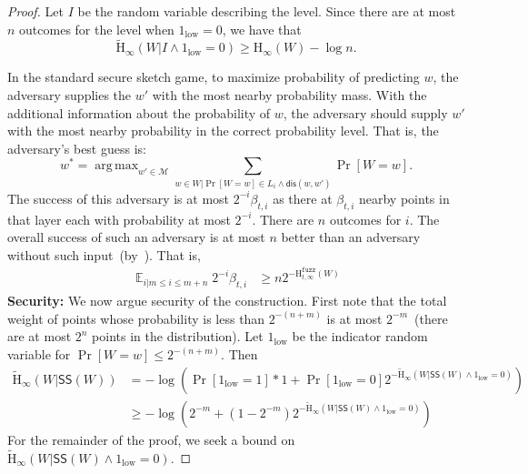 \documentclass[11pt]{article}
\DeclareMathOperator*{\expe}{\mathbb{E}}
\DeclareMathOperator*{\argmax}{arg\,max}
\newcommand{\class}[1]{{\ensuremath{\mathsf{#1}}}}
\newcommand{\sketch}{\ensuremath{\class{SS}}\xspace}
\newcommand{\dis}{\ensuremath{\mathsf{dis}}}
\newcommand{\Hoo}{\mathrm{H}_\infty}
\newcommand{\Hav}{\tilde{\mathrm{H}}_\infty}
\newcommand{\Hfuzz}{\mathrm{H}^{\mathtt{fuzz}}_{t,\infty}}
\begin{document}
\begin{proof}
Let $I$ be the random variable describing the level.  Since there are at most $n$ outcomes for the level when $1_{\text{low}} =0$, we have that \[\Hav( W | I \wedge 1_{\text{low}}=0) \ge \Hoo(W) -\log n.\]

In the standard secure sketch game, to maximize probability of predicting $w$, the adversary supplies the $w'$ with the most nearby probability mass.  With the additional information about the probability of $w$, the adversary should supply $w'$ with the most nearby probability in the correct probability level.  That is, the adversary's best guess is:
\[
w^*= \argmax_{w' \in \mathcal{M}}\sum_{w\in W | \Pr[W=w]\in L_i\wedge \dis(w, w')}\Pr[W=w].
\] 
The success of this adversary is at most $2^{-i}\beta_{t,i}$ as there at $\beta_{t,i}$ nearby points in that layer each with probability at most $2^{-i}$.  There are $n$ outcomes for $i$. The overall success of such an adversary is at most $n$ better than an adversary without such input~(by~\cite[Lemma 2.2]{DBLP:journals/siamcomp/DodisORS08}).  That is, 
\begin{align}
\expe_{i | m\le i \le m+n}2^{-i}\beta_{t,i}%
&\ge n 2^{-\Hfuzz(W)}\label{eq:link fuzz 3}
\end{align}
\textbf{Security:}
We now argue security of the construction.  First note that the total weight of points whose probability is less than $2^{-(n+m)}$ is at most $2^{-m}$~(there are at most $2^n$ points in the distribution).  Let $1_{\text{low}}$ be the indicator random variable for $\Pr[W=w]\le 2^{-(n+m)}$.  Then 
\begin{align}
\Hav(W | \sketch(W)) &= -\log \left(\Pr[1_{\text{low}}=1] * 1 + \Pr[1_{\text{low}} =0]   2^{-\Hav(W | \sketch(W) \wedge 1_{\text{low}} = 0)}\right)\nonumber\\
&\ge -\log\left( 2^{-m} + (1-2^{-m})2^{-\Hav(W | \sketch(W) \wedge 1_{\text{low}} = 0)}\label{eq:min-entropy}\right)
\end{align}
For the remainder of the proof, we seek a bound on $\Hav(W | \sketch(W) \wedge 1_{\text{low}} =0).$


\end{proof}
\end{document}
